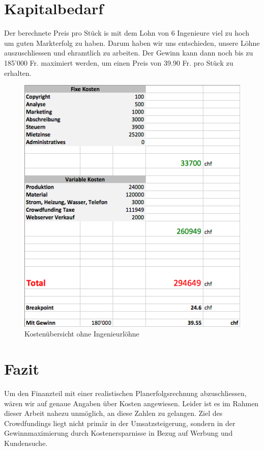 \section{Kapitalbedarf}
Der berechnete Preis pro St\"uck is mit dem Lohn von 6 Ingenieure viel zu hoch um guten Markterfolg zu haben. Darum haben wir uns entschieden, unsere L\"ohne auszuschliessen und ehramtlich zu arbeiten. Der Gewinn kann dann noch bis zu 185'000 Fr. maximiert werden, um einen Preis von 39.90 Fr. pro St\"uck zu erhalten.
\begin{figure}[H]
	\centering
		\includegraphics[scale=0.6]{bilder/ehramtlich.png}
	\caption{Kosten\"ubersicht ohne Ingenieurl\"ohne}
	\label{fig:ehramtlich}
\end{figure}

\section{Fazit}
Um den Finanzteil mit einer realistischen Planerfolgsrechnung abzuschliessen, w\"aren wir auf genaue Angaben \"uber Kosten angewiesen. Leider ist es im Rahmen dieser Arbeit nahezu unm\"oglich, an diese Zahlen zu gelangen. Ziel des Crowdfundings liegt nicht prim\"ar in der Umsatzsteigerung, sondern in der Gewinnmaximierung durch Kostenersparnisse in Bezug auf Werbung und Kundensuche. 